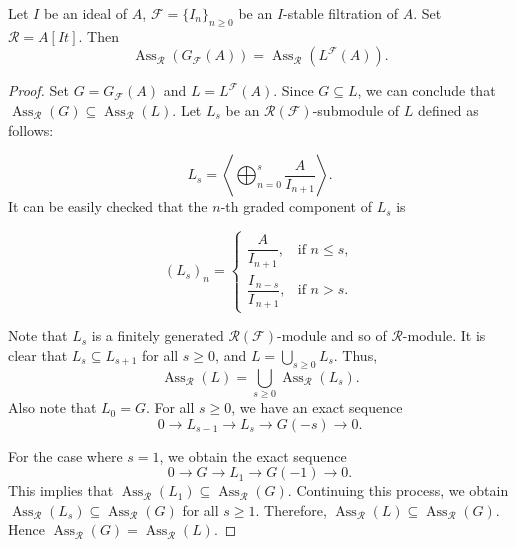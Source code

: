\documentclass[10pt,a4paper]{amsart}
\newcommand{\Ass}{\operatorname{Ass}}
\newcommand{\F}{\mathcal{F}}
\newcommand{\R}{\mathcal{R}}
\begin{document}
\begin{lemma}
\label{Thm:ASS}
    Let  $I$ be an ideal of $A$, $\F=\{I_n\}_{n\geq 0}$ be an $I$-stable filtration of $A$. Set $\R=A[It]$. Then $$\operatorname{Ass}_{\mathcal{R}}({G}_{\F}(A))=\operatorname{Ass}_{\mathcal{R}}({L}^{\F}(A)).$$
    \end{lemma}

    \begin{proof}
     Set $G={G}_{\F}(A)$ and $L={L}^{\F}(A)$.
      Since $G \subseteq L$, we can conclude that $\Ass_\R(G) \subseteq \Ass_\R(L)$.
      Let $L_s$ be an ${\R}(\F)$-submodule of $L$ defined as follows:

      $$L_s =\left \langle \bigoplus_{n=0}^{s}\dfrac{A}{{I_{n+1}}}\right \rangle.$$
It can be easily checked that the $n$-th graded component of $L_s$ is

\[
(L_s)_n =
\begin{cases}
\dfrac{A}{I_{n+1}}, & \text{if } n \leq s, \\[8pt]
\dfrac{I_{\,n-s}}{I_{\,n+1}}, & \text{if } n > s.
\end{cases}
\]

      Note that $L_s$ is a finitely generated ${\R}(\F)$-module and so of $\R$-module. It is clear that $L_s\subseteq L_{s+1}$ for all $s\geq 0$, and $L=\bigcup_{s\geq 0}L_s$. Thus, $$\operatorname{Ass}_{\R}(L)=\bigcup_{s\geq 0}\operatorname{Ass}_{\R}(L_s).$$ Also note that $L_0=G$. For all $s\geq 0$, we have an exact sequence $$0\to L_{s-1}\to L_s\to G(-s)\to 0.$$

For the case where $s=1$, we obtain the exact sequence $$0\to G\to L_1\to G(-1)\to 0.$$ This implies that $\operatorname{Ass}_{\R}(L_1)\subseteq \operatorname{Ass}_{\R}(G)$. Continuing this process, we obtain $\operatorname{Ass}_{\R}(L_s)\subseteq \operatorname{Ass}_{\R}(G)$ for all $s\geq 1.$ Therefore, $\Ass_\R (L) \subseteq \Ass_\R (G)$.
Hence $\operatorname{Ass}_{\R}(G)=\operatorname{Ass}_{\R}(L)$.
\end{proof}
\end{document}
